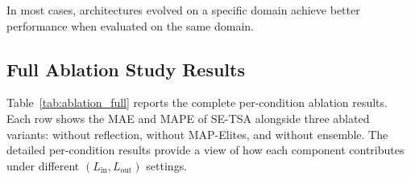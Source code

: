 In most cases, architectures evolved on a specific domain achieve better performance when evaluated on the same domain.

\subsection{Full Ablation Study Results}
\label{app:ablation}

Table~\ref{tab:ablation_full} reports the complete per-condition ablation results. Each row shows the MAE and MAPE of SE-TSA alongside three ablated variants: without reflection, without MAP-Elites, and without ensemble. The detailed per-condition results provide a view of how each component contributes under different $(L_{\text{in}}, L_{\text{out}})$ settings.

\begin{nolinenumbers}
\begin{table}[htbp]
\centering
\caption{Full ablation study results. Red background: best result; blue background: second-best result.}
\label{tab:ablation_full}
\small
\setlength{\tabcolsep}{2pt}
\end{table}
\end{nolinenumbers}
